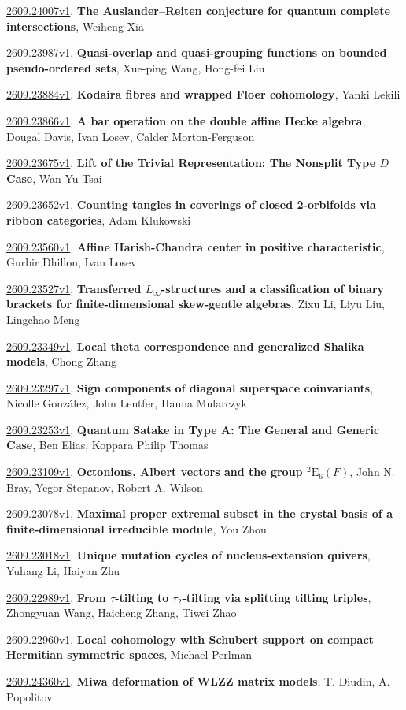 \documentclass[9pt, a4paper]{article}
\theoremstyle{plain}
\theoremstyle{definition}
\theoremstyle{remark}
\newcommand{\arxiv}[3]{\href{https://arxiv.org/abs/#1}{#1}, \textbf{\textcolor{arxivblue}{#2}}, #3}
\begin{document}
\arxiv{2609.24007v1}{The Auslander--Reiten conjecture for quantum complete intersections}{Weiheng Xia}

\arxiv{2609.23987v1}{Quasi-overlap and quasi-grouping functions on bounded pseudo-ordered sets}{Xue-ping Wang, Hong-fei Liu}

\arxiv{2609.23884v1}{Kodaira fibres and wrapped Floer cohomology}{Yanki Lekili}

\arxiv{2609.23866v1}{A bar operation on the double affine Hecke algebra}{Dougal Davis, Ivan Losev, Calder Morton-Ferguson}

\arxiv{2609.23675v1}{Lift of the Trivial Representation: The Nonsplit Type $D$ Case}{Wan-Yu Tsai}

\arxiv{2609.23652v1}{Counting tangles in coverings of closed 2-orbifolds via ribbon categories}{Adam Klukowski}

\arxiv{2609.23560v1}{Affine Harish-Chandra center in positive characteristic}{Gurbir Dhillon, Ivan Losev}

\arxiv{2609.23527v1}{Transferred $L_\infty$-structures and a classification of binary brackets for finite-dimensional skew-gentle algebras}{Zixu Li, Liyu Liu, Lingchao Meng}

\arxiv{2609.23349v1}{Local theta correspondence and generalized Shalika models}{Chong Zhang}

\arxiv{2609.23297v1}{Sign components of diagonal superspace coinvariants}{Nicolle González, John Lentfer, Hanna Mularczyk}

\arxiv{2609.23253v1}{Quantum Satake in Type A: The General and Generic Case}{Ben Elias, Koppara Philip Thomas}

\arxiv{2609.23109v1}{Octonions, Albert vectors and the group ${}^2 \mathrm{E}_6(F)$}{John N. Bray, Yegor Stepanov, Robert A. Wilson}

\arxiv{2609.23078v1}{Maximal proper extremal subset in the crystal basis of a finite-dimensional irreducible module}{You Zhou}

\arxiv{2609.23018v1}{Unique mutation cycles of nucleus-extension quivers}{Yuhang Li, Haiyan Zhu}

\arxiv{2609.22989v1}{From $τ$-tilting to $τ_2$-tilting via splitting tilting triples}{Zhongyuan Wang, Haicheng Zhang, Tiwei Zhao}

\arxiv{2609.22960v1}{Local cohomology with Schubert support on compact Hermitian symmetric spaces}{Michael Perlman}

\arxiv{2609.24360v1}{Miwa deformation of WLZZ matrix models}{T. Diudin, A. Popolitov}
\end{document}
